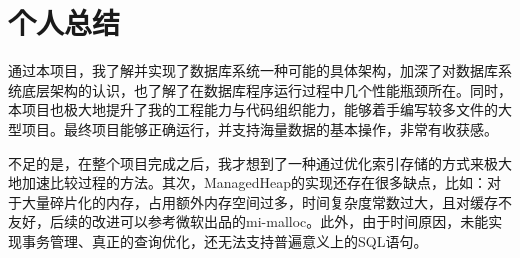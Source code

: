\documentclass[12pt, a4paper]{article}
\def\s#1{\section{#1}}
\def\p{\par}
\begin{document}
\s{个人总结}
\p 通过本项目，我了解并实现了数据库系统一种可能的具体架构，加深了对数据库系统底层架构的认识，也了解了在数据库程序运行过程中几个性能瓶颈所在。同时，本项目也极大地提升了我的工程能力与代码组织能力，能够着手编写较多文件的大型项目。最终项目能够正确运行，并支持海量数据的基本操作，非常有收获感。
\p 不足的是，在整个项目完成之后，我才想到了一种通过优化索引存储的方式来极大地加速比较过程的方法。其次，ManagedHeap的实现还存在很多缺点，比如：对于大量碎片化的内存，占用额外内存空间过多，时间复杂度常数过大，且对缓存不友好，后续的改进可以参考微软出品的mi-malloc。此外，由于时间原因，未能实现事务管理、真正的查询优化，还无法支持普遍意义上的SQL语句。
\end{document}
